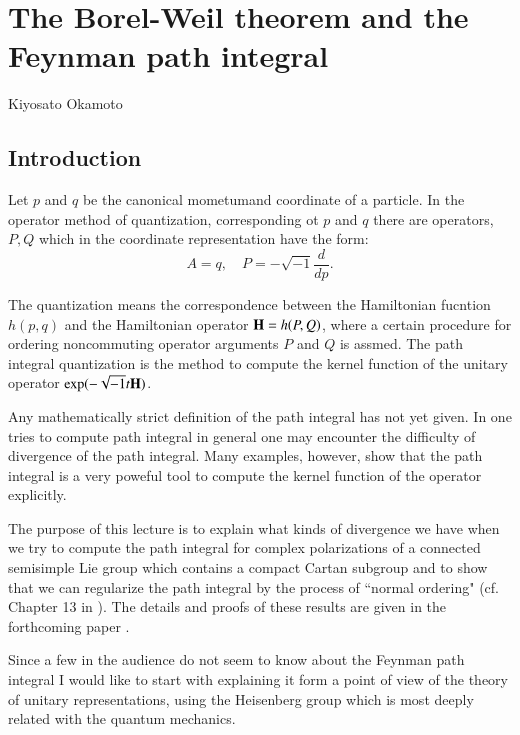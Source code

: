 \chapter{The Borel-Weil theorem and the Feynman path integral}\label{chap15}


\begin{center}
Kiyosato Okamoto
\end{center}


\section*{Introduction}

Let $p$ and $q$ be the canonical mometum\pageoriginale and coordinate of a particle. In the operator method of quantization, corresponding ot $p$ and $q$ there are operators, $P, Q$ which in the coordinate representation have the form:
$$
A=q, \quad P=-\sqrt{-1}\dfrac{d}{dp}.
$$

The quantization means the correspondence between the Hamiltonian fucntion $h(p, q)$ and the Hamiltonian operator $\mathbf{H}= h(P, Q)$, where a certain procedure for ordering noncommuting operator arguments $P$ and $Q$ is assmed. The path integral quantization is the method to compute the kernel function of the unitary operator $\exp(-\sqrt{-1}t \mathbf{H})$.

Any mathematically strict definition of the path integral has not yet given. In one tries to compute path integral in general one may encounter the difficulty of divergence of the path integral. Many examples, however, show that the path integral is a very poweful tool to compute the kernel function of the operator explicitly.

The purpose of this lecture is to explain what kinds of divergence we have when we try to compute the path integral for complex polarizations of a connected semisimple Lie group which contains a compact Cartan subgroup and to show that we can regularize the path integral by the process of ``normal ordering" (cf. Chapter 13 in \cite{chap15-key10}). The details and proofs of these results are given in the forthcoming paper \cite{chap15-key7}.

Since a few in the audience do not seem to know about the Feynman path integral I would like to start with explaining it form a point of view of the theory of unitary representations, using the Heisenberg group which is most deeply related with the quantum mechanics.

